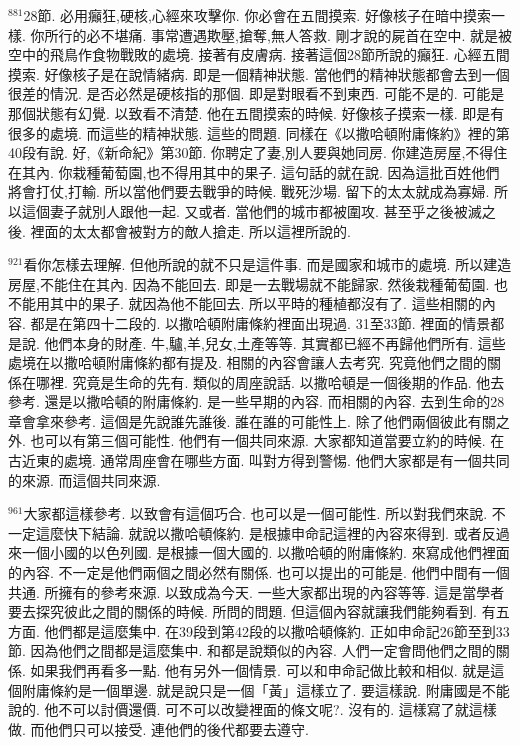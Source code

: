 \documentclass{book}
\begin{document}
$^{881}$28節.
必用癲狂,硬核,心經來攻擊你.
你必會在五間摸索.
好像核子在暗中摸索一樣.
你所行的必不堪痛.
事常遭遇欺壓,搶奪,無人答救.
剛才說的屍首在空中.
就是被空中的飛鳥作食物戰敗的處境.
接著有皮膚病.
接著這個28節所說的癲狂.
心經五間摸索.
好像核子是在說情緒病.
即是一個精神狀態.
當他們的精神狀態都會去到一個很差的情況.
是否必然是硬核指的那個.
即是對眼看不到東西.
可能不是的.
可能是那個狀態有幻覺.
以致看不清楚.
他在五間摸索的時候.
好像核子摸索一樣.
即是有很多的處境.
而這些的精神狀態.
這些的問題.
同樣在《以撒哈頓附庸條約》裡的第40段有說.
好,《新命紀》第30節.
你聘定了妻,別人要與她同房.
你建造房屋,不得住在其內.
你栽種葡萄園,也不得用其中的果子.
這句話的就在說.
因為這批百姓他們將會打仗,打輸.
所以當他們要去戰爭的時候.
戰死沙場.
留下的太太就成為寡婦.
所以這個妻子就別人跟他一起.
又或者.
當他們的城市都被圍攻.
甚至乎之後被滅之後.
裡面的太太都會被對方的敵人搶走.
所以這裡所說的.

$^{921}$看你怎樣去理解.
但他所說的就不只是這件事.
而是國家和城市的處境.
所以建造房屋,不能住在其內.
因為不能回去.
即是一去戰場就不能歸家.
然後栽種葡萄園.
也不能用其中的果子.
就因為他不能回去.
所以平時的種植都沒有了.
這些相關的內容.
都是在第四十二段的.
以撒哈頓附庸條約裡面出現過.
31至33節.
裡面的情景都是說.
他們本身的財產.
牛,驢,羊,兒女,土產等等.
其實都已經不再歸他們所有.
這些處境在以撒哈頓附庸條約都有提及.
相關的內容會讓人去考究.
究竟他們之間的關係在哪裡.
究竟是生命的先有.
類似的周座說話.
以撒哈頓是一個後期的作品.
他去參考.
還是以撒哈頓的附庸條約.
是一些早期的內容.
而相關的內容.
去到生命的28章會拿來參考.
這個是先說誰先誰後.
誰在誰的可能性上.
除了他們兩個彼此有關之外.
也可以有第三個可能性.
他們有一個共同來源.
大家都知道當要立約的時候.
在古近東的處境.
通常周座會在哪些方面.
叫對方得到警惕.
他們大家都是有一個共同的來源.
而這個共同來源.

$^{961}$大家都這樣參考.
以致會有這個巧合.
也可以是一個可能性.
所以對我們來說.
不一定這麼快下結論.
就說以撒哈頓條約.
是根據申命記這裡的內容來得到.
或者反過來一個小國的以色列國.
是根據一個大國的.
以撒哈頓的附庸條約.
來寫成他們裡面的內容.
不一定是他們兩個之間必然有關係.
也可以提出的可能是.
他們中間有一個共通.
所擁有的參考來源.
以致成為今天.
一些大家都出現的內容等等.
這是當學者要去探究彼此之間的關係的時候.
所問的問題.
但這個內容就讓我們能夠看到.
有五方面.
他們都是這麼集中.
在39段到第42段的以撒哈頓條約.
正如申命記26節至到33節.
因為他們之間都是這麼集中.
和都是說類似的內容.
人們一定會問他們之間的關係.
如果我們再看多一點.
他有另外一個情景.
可以和申命記做比較和相似.
就是這個附庸條約是一個單邊.
就是說只是一個「黃」這樣立了.
要這樣說.
附庸國是不能說的.
他不可以討價還價.
可不可以改變裡面的條文呢?.
沒有的.
這樣寫了就這樣做.
而他們只可以接受.
連他們的後代都要去遵守.
\end{document}
